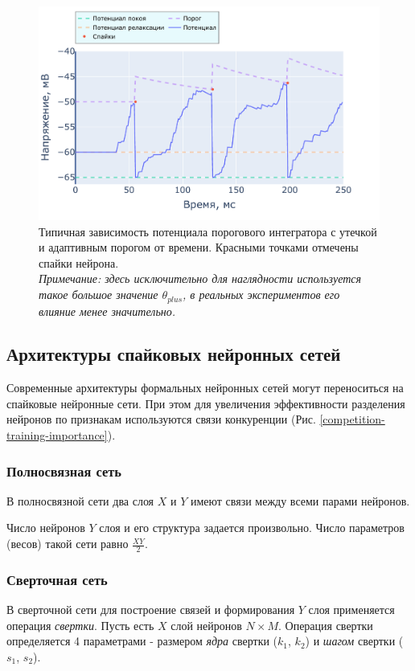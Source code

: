 \documentclass[a4paper]{article}
\begin{document}
\begin{center}
\begin{figure}[H] 
 \includegraphics[width=\textwidth,keepaspectratio=true]{model_alif_ru.pdf}
 \caption{Типичная зависимость потенциала порогового интегратора с утечкой и адаптивным порогом от времени. Красными точками отмечены спайки нейрона.\\
 \textit{Примечание: здесь исключительно для наглядности используется такое большое значение $\theta_{plus}$, в реальных экспериментов его влияние менее значительно.}}
\end{figure} 
\end{center}

\subsection{Архитектуры спайковых нейронных сетей}
Современные архитектуры формальных нейронных сетей могут переноситься на спайковые нейронные сети. При этом для увеличения эффективности разделения нейронов по признакам используются связи конкуренции (Рис. \ref{competition-training-importance}). 

\subsubsection{Полносвязная сеть}
В полносвязной сети два слоя $X$ и $Y$ имеют связи между всеми парами нейронов.

Число нейронов $Y$ слоя и его структура задается произвольно. Число параметров (весов) такой сети равно $\frac{XY}{2}$.

\subsubsection{Сверточная сеть}
В сверточной сети для построение связей и формирования $Y$ слоя применяется операция \textit{свертки}. Пусть есть $X$ слой нейронов $N \times M$. Операция свертки определяется 4 параметрами - размером \textit{ядра} свертки ($k_1$, $k_2$) и \textit{шагом} свертки ($s_1$, $s_2$).
\end{document}
